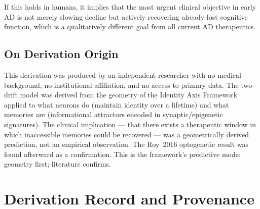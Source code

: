 \documentclass[12pt,a4paper]{article}
\begin{document}
If this holds in humans, it implies that the most
urgent clinical objective in early AD is not merely
slowing decline but actively recovering already-lost
cognitive function, which is a qualitatively different
goal from all current AD therapeutics.

\subsection{On Derivation Origin}

This derivation was produced by an independent researcher
with no medical background, no institutional affiliation,
and no access to primary data. The two-drift model was
derived from the geometry of the Identity Axis Framework
applied to what neurons do (maintain identity over a
lifetime) and what memories are (informational attractors
encoded in synaptic/epigenetic signatures). The clinical
implication --- that there exists a therapeutic window
in which inaccessible memories could be recovered ---
was a geometrically derived prediction, not an empirical
observation. The Roy~2016 optogenetic result was found
afterward as a confirmation. This is the framework's
predictive mode: geometry first; literature confirms.

\section{Derivation Record and Provenance}
\end{document}
